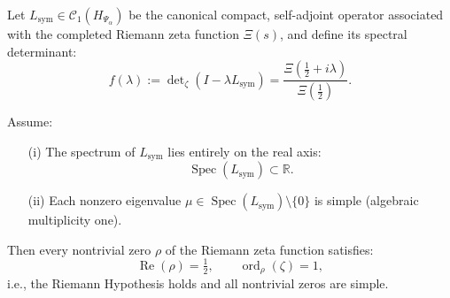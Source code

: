 \begin{proposition}
\label{prop:spectrum_reality_implies_rh_multiplicity}

Let \( L_{\mathrm{sym}} \in \mathcal{C}_1(H_{\Psi_\alpha}) \) be the canonical compact, self-adjoint operator associated with the completed Riemann zeta function \( \Xi(s) \), and define its spectral determinant:
\[
f(\lambda) := \det\nolimits_\zeta(I - \lambda L_{\mathrm{sym}}) = \frac{\Xi\left( \tfrac{1}{2} + i\lambda \right)}{\Xi\left( \tfrac{1}{2} \right)}.
\]

Assume:
\begin{enumerate}
  \item[\textup{(i)}] The spectrum of \( L_{\mathrm{sym}} \) lies entirely on the real axis:
  \[
  \operatorname{Spec}(L_{\mathrm{sym}}) \subset \mathbb{R}.
  \]

  \item[\textup{(ii)}] Each nonzero eigenvalue \( \mu \in \operatorname{Spec}(L_{\mathrm{sym}}) \setminus \{0\} \) is simple (algebraic multiplicity one).
\end{enumerate}

Then every nontrivial zero \( \rho \) of the Riemann zeta function satisfies:
\[
\operatorname{Re}(\rho) = \tfrac{1}{2}, \qquad \operatorname{ord}_\rho(\zeta) = 1,
\]
i.e., the Riemann Hypothesis holds and all nontrivial zeros are simple.
\end{proposition}

